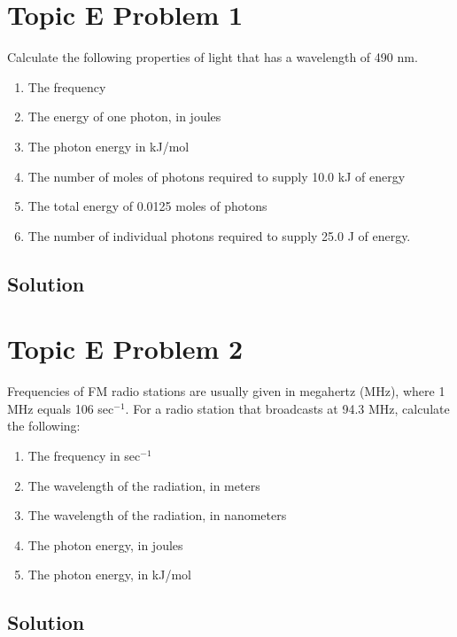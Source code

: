 \documentclass[10pt]{article}
\begin{document}
    \section{Topic E Problem 1}
        Calculate the following properties of light that has a wavelength of 490 nm.
        \begin{enumerate}[label=\alph*)]
            \item   The frequency
            \item   The energy of one photon, in joules
            \item   The photon energy in kJ/mol
            \item   The number of moles of photons required to supply 10.0 kJ of energy
            \item   The total energy of 0.0125 moles of photons
            \item   The number of individual photons required to supply 25.0 J of energy.
        \end{enumerate}

        \subsection{Solution}


    \pagebreak
    \section{Topic E Problem 2}
        Frequencies of FM radio stations are usually given in megahertz (MHz), where 1 MHz equals 106 sec$^{-1}$. 
        For a radio station that broadcasts at 94.3 MHz, calculate the following:
        \begin{enumerate}[label=\alph*)]
            \item   The frequency in sec$^{-1}$
            \item   The wavelength of the radiation, in meters
            \item   The wavelength of the radiation, in nanometers
            \item   The photon energy, in joules
            \item   The photon energy, in kJ/mol
        \end{enumerate}
        
        \subsection{Solution}
\end{document}
